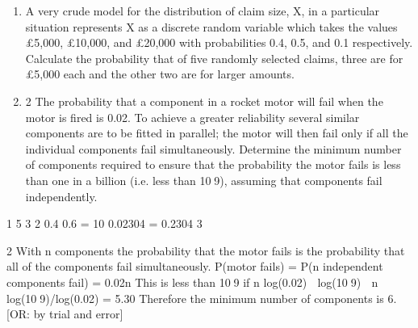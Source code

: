 \documentclass[a4paper,12pt]{article}
\begin{document}
\begin{enumerate}
\item A very crude model for the distribution of claim size, X, in a particular situation
represents X as a discrete random variable which takes the values £5,000, £10,000,
and £20,000 with probabilities 0.4, 0.5, and 0.1 respectively.
Calculate the probability that of five randomly selected claims, three are for £5,000
each and the other two are for larger amounts. 
\item 2 The probability that a component in a rocket motor will fail when the motor is fired is
0.02. To achieve a greater reliability several similar components are to be fitted in
parallel; the motor will then fail only if all the individual components fail
simultaneously.
Determine the minimum number of components required to ensure that the
probability the motor fails is less than one in a billion (i.e. less than 109), assuming
that components fail independently. 
 
\end{enumerate}
\newpage

1 5 3 2
0.4 0.6 = 10 0.02304 = 0.2304
3
 
  
 


2 With n components the probability that the motor fails is the probability that all of the
components fail simultaneously.
P(motor fails) = P(n independent components fail) = 0.02n
This is less than 109 if n log(0.02)  log(109)  n  log(109)/log(0.02) = 5.30
Therefore the minimum number of components is 6.
[OR: by trial and error]
\end{document}
